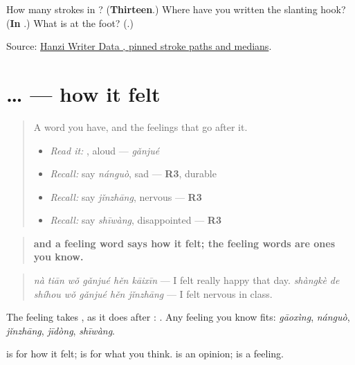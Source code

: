 \begin{tcolorbox}[breakable,colback=teal!4,colframe=teal!35!black,title={Before you move on}]
How many strokes in ? (\textbf{Thirteen}.) Where have you written the slanting hook? (\textbf{In }.) What is at the foot? (\textbf{}.)

Source: \href{https://raw.githubusercontent.com/chanind/hanzi-writer-data/68d10a4b21150cae5e1ebbd223eed289cf32d90c/data/\%E6\%84\%9F.json}{Hanzi Writer Data , pinned stroke paths and medians}.
\end{tcolorbox}
\section[\texorpdfstring{\zh{我感觉}… (wǒ gǎnjué …)}{我感觉… (wǒ gǎnjué …)}]{… — how it felt}

\label{lesson:ZH-C286-feeling}



\begin{quote}
A word you have, and the feelings that go after it.

\begin{itemize}
\raggedright
  \item \emph{Read it:} , aloud — \emph{gǎnjué}
  \item \emph{Recall:} say \emph{nánguò}, sad — \textbf{R3}, durable
  \item \emph{Recall:} say \emph{jǐnzhāng}, nervous — \textbf{R3}
  \item \emph{Recall:} say \emph{shīwàng}, disappointed — \textbf{R3}
\end{itemize}
\end{quote}

\begin{grammarlens}[title={Grammar Lens: \zh{我感觉} and a feeling}]
\begin{quote}
\textbf{ and a feeling word says how it felt; the feeling words are ones you know.}
\end{quote}

\begin{quote}
\textbf{} \emph{nà tiān wǒ gǎnjué hěn kāixīn} — I felt really happy that day. \emph{shàngkè de shíhou wǒ gǎnjué hěn jǐnzhāng} — I felt nervous in class.
\end{quote}

The feeling takes , as it does after : . Any feeling you know fits: \emph{gāoxìng}, \emph{nánguò}, \emph{jǐnzhāng}, \emph{jīdòng}, \emph{shīwàng}.

 is for how it felt;  is for what you think.  is an opinion;  is a feeling.
\end{grammarlens}

